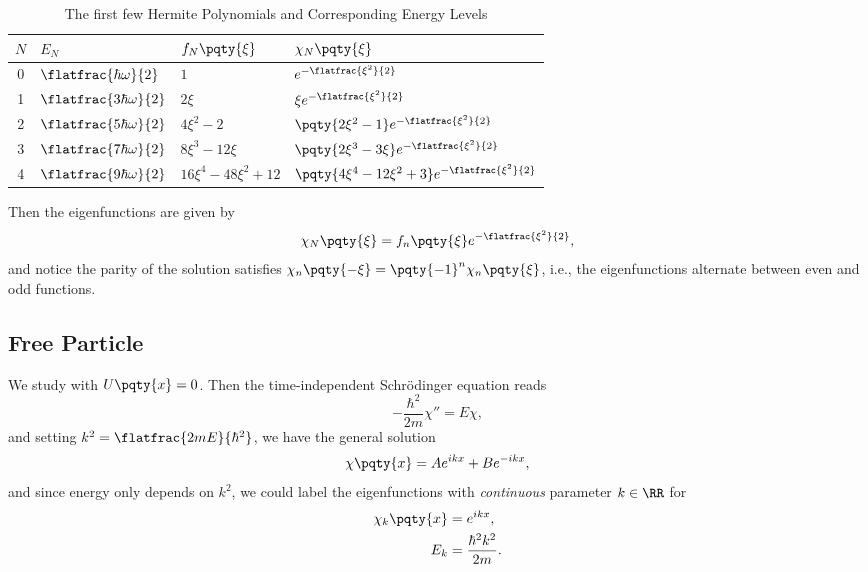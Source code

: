 \begin{table}[ht!]
    \centering
    \begin{tabular}{clll}
        \toprule
        \(N\) & \(E_N\) & \(f_N\pqty{\xi}\) & \(\chi_N\pqty{\xi}\)\\
        \midrule
        0 & \(\flatfrac{\hbar \omega}{2}\) & \(1\) & \(e^{-\flatfrac{\xi^2}{2}}\) \\
        1 & \(\flatfrac{3 \hbar \omega}{2}\) & \(2 \xi\) & \(\xi e^{-\flatfrac{\xi^2}{2}}\) \\
        2 & \(\flatfrac{5 \hbar \omega}{2}\) & \(4 \xi^2 - 2\) & \(\pqty{2 \xi^2 - 1} e^{-\flatfrac{\xi^2}{2}}\) \\
        3 & \(\flatfrac{7 \hbar \omega}{2}\) & \(8 \xi^3 - 12 \xi\) & \(\pqty{2 \xi^3 - 3 \xi} e^{-\flatfrac{\xi^2}{2}}\) \\
        4 & \(\flatfrac{9 \hbar \omega}{2}\) & \(16 \xi^4 - 48 \xi^2 + 12\) & \(\pqty{4 \xi^4 - 12 \xi^2 + 3} e^{-\flatfrac{\xi^2}{2}}\) \\
        \bottomrule
    \end{tabular}
    \caption{The first few Hermite Polynomials and Corresponding Energy Levels}
    \label{tab:harmonic-oscillator-eigenfunctions}%
\end{table}

Then the eigenfunctions are given by
\begin{equation}
    \chi_N \pqty{\xi} = f_n\pqty{\xi} e^{-\flatfrac{\xi^2}{2}},
\end{equation}
and notice the parity of the solution satisfies \(\chi_n\pqty{-\xi} = \pqty{-1}^{n} \chi_n\pqty{\xi}\), i.e., the eigenfunctions alternate between even and odd functions.

\subsection{Free Particle}

We study  with \(U\pqty{x} = 0\). Then the time-independent Schr\"{o}dinger equation reads
\begin{equation}
    - \frac{\hbar^2}{2 m} \chi'' = E \chi,
\end{equation}
and setting \(k^2 = \flatfrac{2 m E}{\hbar^2}\), we have the general solution
\begin{equation}
    \chi\pqty{x} = A e^{i k x} + B e^{- i k x},
\end{equation}
and since energy only depends on \(k^2\), we could label the eigenfunctions with \emph{continuous} parameter \(k \in \RR\) for
\begin{subequations}
    \begin{align}
        \chi_k\pqty{x} &= e^{i k x}, \\
        E_k &= \frac{\hbar^2 k^2}{2 m}.
    \end{align}
\end{subequations}


